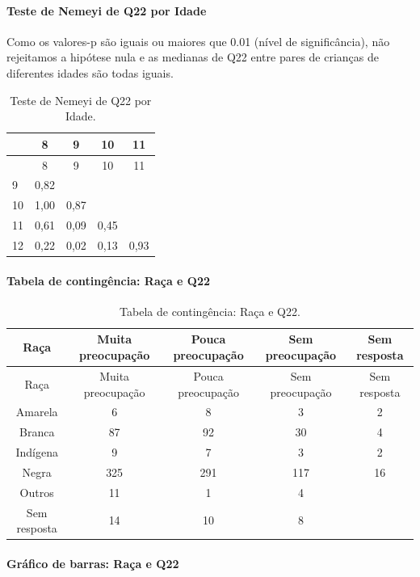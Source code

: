 \documentclass[]{article}
\let\oldparagraph\paragraph
\renewcommand{\paragraph}[1]{\oldparagraph{#1}\mbox{}}
\begin{document}
\hypertarget{teste-de-nemeyi-de-q22-por-idade}{%
\paragraph{Teste de Nemeyi de Q22 por Idade}\label{teste-de-nemeyi-de-q22-por-idade}}

Como os valores-p são iguais ou maiores que 0.01 (nível de significância), não rejeitamos a hipótese nula e as medianas de Q22 entre pares de crianças de diferentes idades são todas iguais.

\begin{longtable}[]{@{}lcccc@{}}
\caption{\label{tab:unnamed-chunk-514}Teste de Nemeyi de Q22 por Idade.}\tabularnewline
\toprule
& 8 & 9 & 10 & 11\tabularnewline
\midrule
\endfirsthead
\toprule
& 8 & 9 & 10 & 11\tabularnewline
\midrule
\endhead
9 & 0,82 & & &\tabularnewline
10 & 1,00 & 0,87 & &\tabularnewline
11 & 0,61 & 0,09 & 0,45 &\tabularnewline
12 & 0,22 & 0,02 & 0,13 & 0,93\tabularnewline
\bottomrule
\end{longtable}

\cleardoublepage

\hypertarget{tabela-de-continguxeancia-rauxe7a-e-q22}{%
\paragraph{Tabela de contingência: Raça e Q22}\label{tabela-de-continguxeancia-rauxe7a-e-q22}}

\begin{longtable}[]{@{}ccccc@{}}
\caption{\label{tab:unnamed-chunk-515}Tabela de contingência: Raça e Q22.}\tabularnewline
\toprule
Raça & Muita preocupação & Pouca preocupação & Sem preocupação & Sem resposta\tabularnewline
\midrule
\endfirsthead
\toprule
Raça & Muita preocupação & Pouca preocupação & Sem preocupação & Sem resposta\tabularnewline
\midrule
\endhead
Amarela & 6 & 8 & 3 & 2\tabularnewline
Branca & 87 & 92 & 30 & 4\tabularnewline
Indígena & 9 & 7 & 3 & 2\tabularnewline
Negra & 325 & 291 & 117 & 16\tabularnewline
Outros & 11 & 1 & 4 &\tabularnewline
Sem resposta & 14 & 10 & 8 &\tabularnewline
\bottomrule
\end{longtable}

\hypertarget{gruxe1fico-de-barras-rauxe7a-e-q22}{%
\paragraph{Gráfico de barras: Raça e Q22}\label{gruxe1fico-de-barras-rauxe7a-e-q22}}
\end{document}
